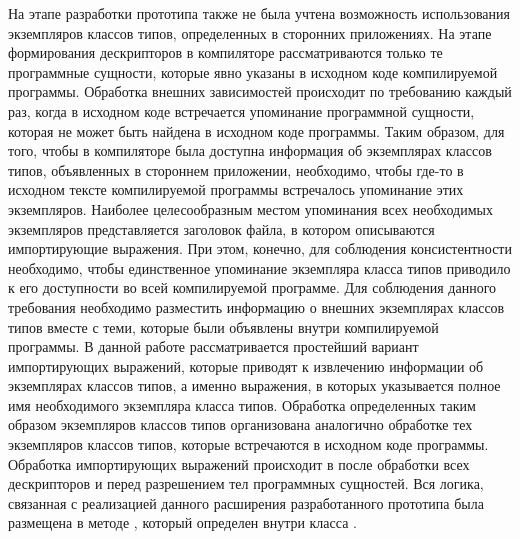 На этапе разработки прототипа также не была учтена возможность использования экземпляров классов типов, определенных в сторонних приложениях. На этапе формирования дескрипторов в компиляторе рассматриваются только те программные сущности, которые явно указаны в исходном коде компилируемой программы. Обработка внешних зависимостей происходит по требованию каждый раз, когда в исходном коде встречается упоминание программной сущности, которая не может быть найдена в исходном коде программы. Таким образом, для того, чтобы в компиляторе была доступна информация об экземплярах классов типов, объявленных в стороннем приложении, необходимо, чтобы где-то в исходном тексте компилируемой программы встречалось упоминание этих экземпляров. Наиболее целесообразным местом упоминания всех необходимых экземпляров представляется заголовок файла, в котором описываются импортирующие выражения. При этом, конечно, для соблюдения консистентности необходимо, чтобы единственное упоминание экземпляра класса типов приводило к его доступности во всей компилируемой программе. Для соблюдения данного требования необходимо разместить информацию о внешних экземплярах классов типов вместе с теми, которые были объявлены внутри компилируемой программы. В данной работе рассматривается простейший вариант импортирующих выражений, которые приводят к извлечению информации об экземплярах классов типов, а именно выражения, в которых указывается полное имя необходимого экземпляра класса типов. Обработка определенных таким образом экземпляров классов типов организована аналогично обработке тех экземпляров классов типов, которые встречаются в исходном коде программы. Обработка импортирующих выражений происходит в  после обработки всех дескрипторов и перед разрешением тел программных сущностей. Вся логика, связанная с реализацией данного расширения разработанного прототипа была размещена в методе , который определен внутри класса .    


